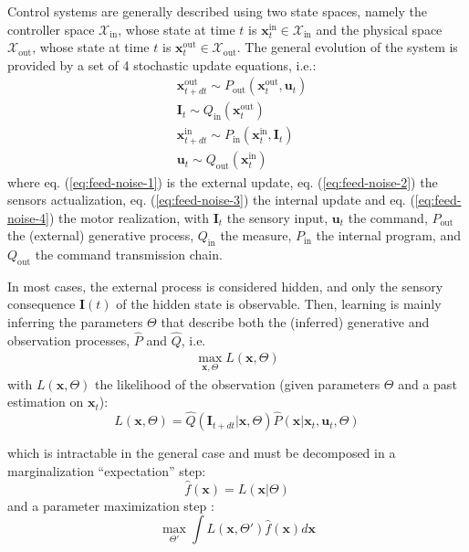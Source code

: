 \documentclass[11pt]{article}
\begin{document}
Control systems are generally described using two state spaces, namely the controller space $\mathcal{X}_\text{in}$, whose state at time $t$ is $\boldsymbol{x}^\text{in}_t \in\mathcal{X}_\text{in} $ and the physical space $\mathcal{X}_\text{out}$, whose state at time $t$ is $\boldsymbol{x}^\text{out}_t \in\mathcal{X}_\text{out}$. The general evolution of the system is provided by a set of 4 stochastic update equations, i.e.:
  \begin{align}
  &{\boldsymbol{x}}^\text{out}_{t+dt} \sim P_\text{out}(\boldsymbol{x}^\text{out}_t,\boldsymbol{u}_t) \label{eq:feed-noise-1} \\
  &\boldsymbol{I}_t \sim Q_\text{in}(\boldsymbol{x}^\text{out}_t) \label{eq:feed-noise-2}\\
  &{\boldsymbol{x}}^\text{in}_{t+dt} \sim P_\text{in}(\boldsymbol{x}^\text{in}_t,\boldsymbol{I}_t) \label{eq:feed-noise-3} \\
  &\boldsymbol{u}_t \sim Q_\text{out}(\boldsymbol{x}^\text{in}_t) \label{eq:feed-noise-4}
  \end{align}
where eq. (\ref{eq:feed-noise-1}) is the external update,  eq. (\ref{eq:feed-noise-2}) the sensors actualization, eq. (\ref{eq:feed-noise-3}) the internal update and  eq. (\ref{eq:feed-noise-4})  the motor realization, with $\boldsymbol{I}_ t$ the sensory input,  $\boldsymbol{u}_t$ the command, $P_\text{out}$ the (external) generative process, $Q_\text{in}$ the measure, $P_\text{in}$ the internal program, and  $Q_\text{out}$ the command transmission chain. 

In most cases, the external process is considered hidden, and only the sensory consequence $\boldsymbol{I}(t)$ of the hidden state is observable. Then, learning is mainly inferring the parameters $\Theta$ that describe both the (inferred) generative and observation processes, $\hat{P}$ and $\hat{Q}$, i.e. 
\begin{align}
\max_{\boldsymbol{x},\Theta} L(\boldsymbol{x},\Theta)
\end{align}
with  $L(\boldsymbol{x},\Theta)$ the likelihood of the observation (given parameters $\Theta$ and a past estimation on $\boldsymbol{x}_t$):
\begin{equation}
L(\boldsymbol{x},\Theta) = \hat{Q}(\boldsymbol{I}_{t+dt}|{\boldsymbol{x}},\Theta)\hat{P}({\boldsymbol{x}}|{\boldsymbol{x}}_t,\boldsymbol{u}_t,\Theta) \label{eq:lik}
\end{equation}

which is intractable in the general case and must be decomposed in a marginalization ``expectation'' step:
$$\hat{f}(\boldsymbol{x}) = L(\boldsymbol{x}|\Theta)$$
and a parameter maximization step :
$$\max_{\Theta'} \int L(\boldsymbol{x},\Theta')
\hat{f}(\boldsymbol{x}) d\boldsymbol{x} \label{eq:Dempster}$$
\end{document}
